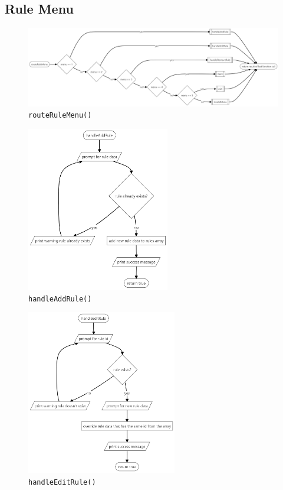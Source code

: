 \documentclass[12pt,titlepage]{article}
\begin{document}
\pagebreak

\subsection{Rule Menu}

\begin{figure}[h]
    \centering
    \includegraphics[width=\textwidth]{flowcharts/route-rule-menu.png}
    \caption{\texttt{routeRuleMenu()}}
\end{figure}

\pagebreak

\begin{figure}[h]
    \centering
    \includegraphics[height=7.2cm]{flowcharts/handle-add-rule.png}
    \caption{\texttt{handleAddRule()}}
\end{figure}

\begin{figure}[h]
    \centering
    \includegraphics[height=7.2cm]{flowcharts/handle-edit-rule.png}
    \caption{\texttt{handleEditRule()}}
\end{figure}
\end{document}
